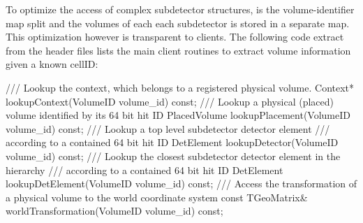 \documentclass[10pt,a4paper]{article}
\begin{document}
\noindent
To optimize the access of complex subdetector structures, is the volume-identifier
map split and the volumes of each each subdetector is stored in a separate map.
This optimization however is transparent to clients. The following code extract
from the header files lists the main client routines to extract volume information
given a known cellID:
\begin{code}
  /// Lookup the context, which belongs to a registered physical volume.
  Context* lookupContext(VolumeID volume_id) const;
  /// Lookup a physical (placed) volume identified by its 64 bit hit ID
  PlacedVolume lookupPlacement(VolumeID volume_id) const;
  /// Lookup a top level subdetector detector element 
  /// according to a contained 64 bit hit ID
  DetElement lookupDetector(VolumeID volume_id) const;
  /// Lookup the closest subdetector detector element in the hierarchy 
  /// according to a contained 64 bit hit ID
  DetElement lookupDetElement(VolumeID volume_id) const;
  /// Access the transformation of a physical volume to the world coordinate system
  const TGeoMatrix& worldTransformation(VolumeID volume_id) const;
\end{code}

\end{document}
